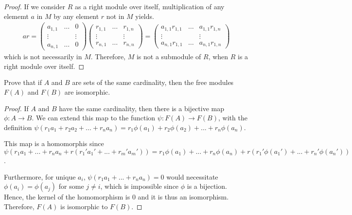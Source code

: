 \documentclass[10pt]{article}
\newenvironment{problem}[2][Problem]{\begin{trivlist}
		\item[\hskip \labelsep {\bfseries #1}\hskip \labelsep {\bfseries #2.}]}{\end{trivlist}}
\begin{document}
\begin{problem}{1.21}
\begin{proof}
			If we consider $R$ as a right module over itself, multiplication of any elememt $a$ in $M$ by any element $r$ not in $M$ yields.
			\begin{align*}
				ar = \begin{pmatrix}
					a_{1,1} & \dots & 0 \\
					\vdots &  & \vdots \\
					a_{n,1} & \dots & 0
				\end{pmatrix}
				\begin{pmatrix}
					r_{1,1} & \dots & r_{1,n} \\
					\vdots &  & \vdots \\
					r_{n,1} & \dots & r_{n,n}
				\end{pmatrix} = 
				\begin{pmatrix}
					a_{1,1}r_{1,1} & \dots & a_{1,1}r_{1,n} \\
					\vdots &  & \vdots \\
					a_{n,1}r_{1,1} & \dots & a_{n,1}r_{1,n}
				\end{pmatrix}
			\end{align*}
			which is not necessarily in $M$. Therefore, $M$ is not a submodule of $R$, when $R$ is a right module over itself.  
		\end{proof}
	\end{problem}
	
	\begin{problem}{3.1}
		Prove that if $A$ and $B$ are sets of the same cardinality, then the free modules $F(A)$ and
		$F(B)$ are isomorphic.
		\begin{proof}
			If $A$ and $B$ have the same cardinality, then there is a bijective map $\phi : A \rightarrow B$. We can extend this map to the function $\psi: F(A) \rightarrow F(B)$, with the definition $\psi(r_1a_1 + r_2a_2 + ... + r_na_n) = r_1\phi(a_1) + r_2\phi(a_2) + ... + r_n\phi(a_n)$. 
			
			This map is a homomorphis since $\psi(r_1a_1 + ... + r_na_n + r(r_1'a_1' + ... + r_m'a_m')) = r_1\phi(a_1) + ... + r_n\phi(a_n) + r(r_1'\phi(a_1') + ... + r_n'\phi(a_n'))$. 
			
			Furthermore, for unique $a_i$, $\psi(r_1a_1 + ... + r_na_n)=0$ would necessitate $\phi(a_i) = \phi(a_j)$ for some $j \not= i$, which is impossible since $\phi$ is a bijection. Hence, the kernel of the homomorphism is $0$ and it is thus an isomorphism. Therefore, $F(A)$ is isomorphic to $F(B)$.
		\end{proof}
	\end{problem}
	
\end{document}
